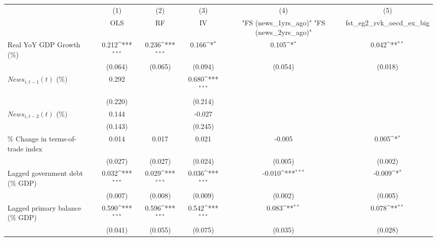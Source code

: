 {
\def\sym#1{\ifmmode^{#1}\else\(^{#1}\)\fi}
\begin{tabular}{l*{5}{c}}
\toprule
                    &\multicolumn{1}{c}{(1)}&\multicolumn{1}{c}{(2)}&\multicolumn{1}{c}{(3)}&\multicolumn{1}{c}{(4)}&\multicolumn{1}{c}{(5)}\\
                    &\multicolumn{1}{c}{OLS}&\multicolumn{1}{c}{RF}&\multicolumn{1}{c}{IV}&\multicolumn{1}{c}{ "FS (news_1yrs_ago)"  "FS (news_2yrs_ago)" }&\multicolumn{1}{c}{fst_eg2_rvk_oecd_ex_big}\\
\midrule
Real YoY GDP Growth (\%)&       0.212\sym{***}&       0.236\sym{***}&       0.166\sym{*}  &       0.105\sym{*}  &       0.042\sym{**} \\
                    &     (0.064)         &     (0.065)         &     (0.094)         &     (0.054)         &     (0.018)         \\
\addlinespace
$ News_{i,t-1}(t)$ (\%)&       0.292         &                     &       0.680\sym{***}&                     &                     \\
                    &     (0.220)         &                     &     (0.214)         &                     &                     \\
\addlinespace
$ News_{i,t-2}(t)$ (\%)&       0.144         &                     &      -0.027         &                     &                     \\
                    &     (0.143)         &                     &     (0.245)         &                     &                     \\
\addlinespace
\% Change in terms-of-trade index&       0.014         &       0.017         &       0.021         &      -0.005         &       0.005\sym{*}  \\
                    &     (0.027)         &     (0.027)         &     (0.024)         &     (0.005)         &     (0.002)         \\
\addlinespace
Lagged government debt (\% GDP)&       0.032\sym{***}&       0.029\sym{***}&       0.036\sym{***}&      -0.010\sym{***}&      -0.009\sym{*}  \\
                    &     (0.007)         &     (0.008)         &     (0.009)         &     (0.002)         &     (0.005)         \\
\addlinespace
Lagged primary balance (\% GDP)&       0.590\sym{***}&       0.596\sym{***}&       0.542\sym{***}&       0.083\sym{**} &       0.078\sym{**} \\
                    &     (0.041)         &     (0.055)         &     (0.075)         &     (0.035)         &     (0.028)         \\

\end{tabular}}
